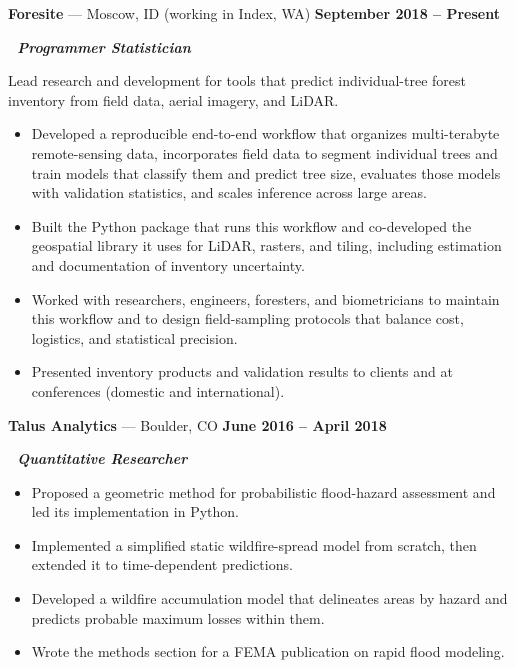 \documentclass[10pt]{article}
\begin{document}
\noindent
\textbf{Foresite} --- Moscow, ID (working in Index, WA) \hfill \textbf{September 2018 -- Present}

\noindent
\,\,
\textbf{\textit{Programmer Statistician}} 

\noindent
Lead research and development for tools that predict individual-tree forest inventory from field data, aerial imagery, and LiDAR.

\begin{itemize}[leftmargin = .35in]
\item Developed a reproducible end-to-end workflow that organizes multi-terabyte remote-sensing data, incorporates field data to segment individual trees and train models that classify them and predict tree size, evaluates those models with validation statistics, and scales inference across large areas.
\item Built the Python package that runs this workflow and co-developed the geospatial library it uses for LiDAR, rasters, and tiling, including estimation and documentation of inventory uncertainty.
\item Worked with researchers, engineers, foresters, and biometricians to maintain this workflow and to design field-sampling protocols that balance cost, logistics, and statistical precision.
\item Presented inventory products and validation results to clients and at conferences (domestic and international).
\end{itemize}

\vspace{2.5mm}
\noindent
\textbf{Talus Analytics} --- Boulder, CO \hfill \textbf{June 2016 -- April 2018}

\noindent
\,\,
\textbf{\textit{Quantitative Researcher}}

\begin{itemize}[leftmargin = .35in]
\item Proposed a geometric method for probabilistic flood-hazard assessment and led its implementation in Python.
\item Implemented a simplified static wildfire-spread model from scratch, then extended it to time-dependent predictions.
\item Developed a wildfire accumulation model that delineates areas by hazard and predicts probable maximum losses within them.
\item Wrote the methods section for a FEMA publication on rapid flood modeling.
\end{itemize}
\end{document}
